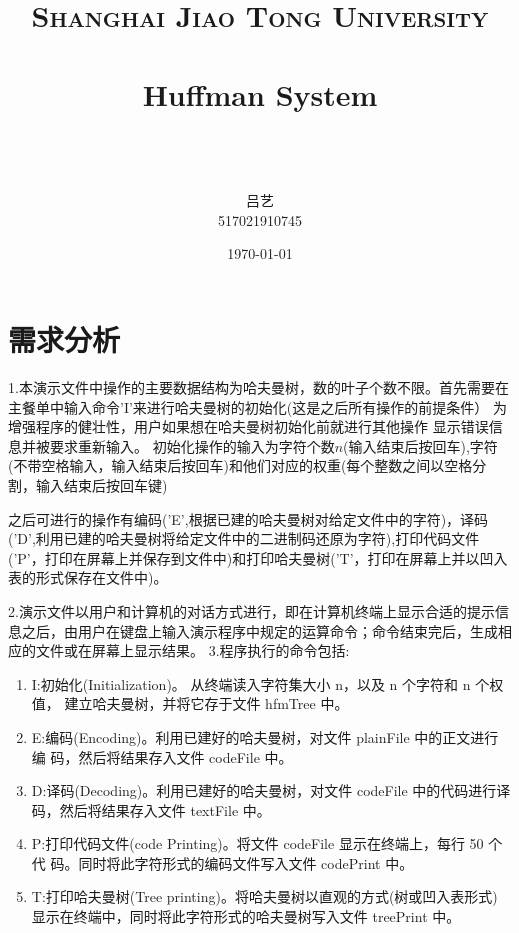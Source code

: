 \documentclass[paper=a4, fontsize=11pt]{scrartcl} %
\title{
\normalfont \normalsize
\textsc{Shanghai Jiao Tong University} \\ [25pt] %
\horrule{0.5pt} \\[0.4cm] %
\huge Huffman System \\ %
\horrule{2pt} \\[0.5cm] %
}
\author{\\ \kaishu 吕艺\\ \normalsize 517021910745} %
\date{\normalsize\today} %
\numberwithin{equation}{section} %
\numberwithin{figure}{section} %
\numberwithin{table}{section} %
\begin{document}
\maketitle %
\kaishu
\section{需求分析}

1.本演示文件中操作的主要数据结构为哈夫曼树，数的叶子个数不限。首先需要在主餐单中输入命令'I'来进行哈夫曼树的初始化(这是之后所有操作的前提条件）
为增强程序的健壮性，用户如果想在哈夫曼树初始化前就进行其他操作
显示错误信息并被要求重新输入。
初始化操作的输入为字符个数$n$(输入结束后按回车),字符(不带空格输入，输入结束后按回车)和他们对应的权重(每个整数之间以空格分割，输入结束后按回车键)

之后可进行的操作有编码('E',根据已建的哈夫曼树对给定文件中的字符)，译码('D',利用已建的哈夫曼树将给定文件中的二进制码还原为字符),打印代码文件('P'，打印在屏幕上并保存到文件中)和打印哈夫曼树('T'，打印在屏幕上并以凹入表的形式保存在文件中)。
\vspace{0.5cm}

2.演示文件以用户和计算机的对话方式进行，即在计算机终端上显示合适的提示信息之后，由用户在键盘上输入演示程序中规定的运算命令；命令结束完后，生成相应的文件或在屏幕上显示结果。
\vspace{0.5cm}
\newpage
3.程序执行的命令包括:
\begin{enumerate}
    \item I:初始化(Initialization)。 从终端读入字符集大小 n，以及 n 个字符和 n 个权值， 建立哈夫曼树，并将它存于文件 hfmTree 中。
    \item E:编码(Encoding)。利用已建好的哈夫曼树，对文件 plainFile 中的正文进行编 码，然后将结果存入文件 codeFile 中。
    \item D:译码(Decoding)。利用已建好的哈夫曼树，对文件 codeFile 中的代码进行译 码，然后将结果存入文件 textFile 中。
    \item P:打印代码文件(code Printing)。将文件 codeFile 显示在终端上，每行 50 个代 码。同时将此字符形式的编码文件写入文件 codePrint 中。
    \item T:打印哈夫曼树(Tree printing)。将哈夫曼树以直观的方式(树或凹入表形式) 显示在终端中，同时将此字符形式的哈夫曼树写入文件 treePrint 中。
\end{enumerate}

\vspace{0.3pt}
\end{document}
